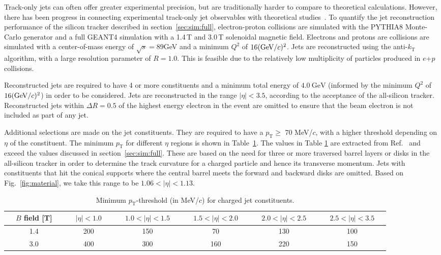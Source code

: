 Track-only jets can often offer greater experimental precision, but are traditionally harder to compare to theoretical calculations. However, there has been progress in connecting experimental track-only jet observables with theoretical studies~\cite{PhysRevD.88.034030}. To quantify the jet reconstruction performance of the silicon tracker described in section~\ref{sec:sim:full}, electron-proton collisions are simulated with the PYTHIA8 Monte-Carlo generator and a full GEANT4 simulation with a 1.4\,T and 3.0\,T solenoidal magnetic field. Electrons and protons are collisions are simulated with a center-of-mass energy of $\sqrt{s}=89$GeV and a minimum $Q^2$ of  $16(\mathrm{GeV}/c)^2$. Jets are reconstructed using the anti-$k_\mathrm{T}$ algorithm, with a large resolution parameter of $R= 1.0$. This is feasible due to the relatively low multiplicity of particles produced in $e$+$p$ collisions. 

Reconstructed jets are required to have 4 or more constituents and a minimum total energy of $4.0~\mathrm{GeV}$ (informed by the minimum $Q^2$ of $16(\mathrm{GeV}/c)^2$) in order to be considered. Jets are reconstructed in the range $|\eta|<3.5$, according to the acceptance of the all-silicon tracker. Reconstructed jets within $\Delta R = 0.5$ of the highest energy electron in the event are omitted to ensure that the beam electron is not included as part of any jet.

Additional selections are made on the jet constituents. They are required to have a $p_\mathrm{T} \geq$ 70 MeV/$c$, with a higher threshold depending on $\eta$ of the constituent. The minimum $p_\mathrm{T}$ for different $\eta$ regions is shown in Table~\ref{tab:min_pt1}. The values in Table \ref{tab:min_pt1} are extracted from Ref.~\cite{DMtable:2020} and exceed the values discussed in section~\ref{sec:sim:full}. These are based on the need for three or more traversed barrel layers or disks in the all-silicon tracker in order to determine the track curvature for a charged particle and hence its transverse momentum. Jets with constituents that hit the conical supports where the central barrel meets the forward and backward disks are omitted. Based on Fig.~\ref{fig:material}, we take this range to be $1.06 < |\eta| < 1.13$.

\begin{table}[htb]
\caption{Minimum $p_\mathrm{T}$-threshold (in MeV/$c$) for charged jet constituents.}
\begin{tabular}{  c | c | c | c | c | c  }
~~$B$ field [T]~~& ~~$ |\eta| < 1.0 $~~ & ~~$ 1.0 < |\eta| < 1.5  $~~ & ~~$1.5 < |\eta| < 2.0 $~~ & ~~$ 2.0 < |\eta| < 2.5 $~~ & ~~$2.5 < |\eta| < 3.5$~~\\
\hline \hline
1.4 & 200 & 150 & 70  & 130  & 100 \\
3.0 & 400 & 300 & 160  & 220  & 150 \\
\end{tabular}
\label{tab:min_pt1}
\end{table}

